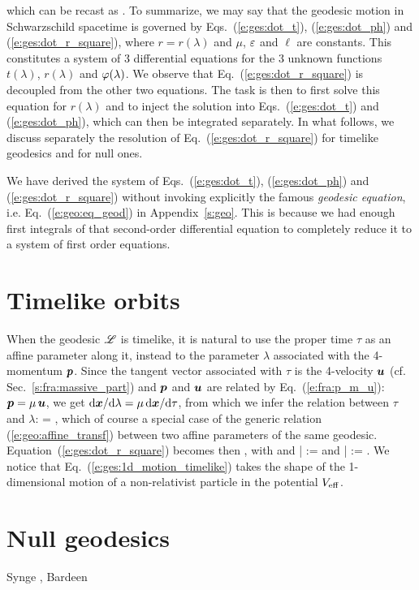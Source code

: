 which can be recast as
\be \label{e:ges:dot_r_square}
     .
\ee
To summarize, we may say that the geodesic motion in Schwarzschild spacetime is governed by
Eqs.~(\ref{e:ges:dot_t}), (\ref{e:ges:dot_ph}) and (\ref{e:ges:dot_r_square}),
where $r=r(\lambda)$ and $\mu$, $\varepsilon$ and $\ell$ are constants.
This constitutes a system of 3 differential equations for the 3 unknown
functions $t(\lambda)$, $r(\lambda)$ and $\varphi(\lambda)$.
We observe
that Eq.~(\ref{e:ges:dot_r_square}) is decoupled from the other two equations.
The task is then to first solve this equation for $r(\lambda)$ and to inject
the solution into Eqs.~(\ref{e:ges:dot_t}) and (\ref{e:ges:dot_ph}), which
can then be integrated separately.
In what follows, we discuss separately the resolution of
Eq.~(\ref{e:ges:dot_r_square}) for timelike geodesics and for null ones.

\begin{remark}
We have derived the system of Eqs.~(\ref{e:ges:dot_t}), (\ref{e:ges:dot_ph}) and (\ref{e:ges:dot_r_square}) without invoking explicitly the
famous \emph{geodesic equation}, i.e.
Eq.~(\ref{e:geo:eq_geod}) in Appendix~\ref{s:geo}.
This is because we had enough
first integrals of that second-order differential equation to completely reduce it to
a system of first order equations.
\end{remark}

\section{Timelike orbits}

When the geodesic $\mathscr{L}$ is timelike, it is natural to use the proper time $\tau$
as an affine parameter along it, instead to the parameter $\lambda$ associated
with the 4-momentum $\bm{p}$. Since the tangent vector associated with $\tau$
is the 4-velocity $\bm{u}$ (cf. Sec.~\ref{s:fra:massive_part}) and $\bm{p}$ and $\bm{u}$ are related by
Eq.~(\ref{e:fra:p_m_u}): $\bm{p} = \mu \, \bm{u}$, we get
$\mathrm{d}\bm{x}/\mathrm{d}\lambda = \mu \, \mathrm{d}\bm{x}/\mathrm{d}\tau$, from which we infer the relation
between $\tau$ and $\lambda$:
\be
    \tau = \mu \lambda ,
\ee
which of course a special case of the generic relation (\ref{e:geo:affine_transf})
between two affine parameters of the same geodesic.
Equation~(\ref{e:ges:dot_r_square}) becomes then
\be \label{e:ges:1d_motion_timelike}
     ,
\ee
with
\be
\ee
and
\be
   \bar{\veps} := \frac{\veps}{\mu} \qquad\mbox{and}\qquad
   \bar{\ell} :=  \frac{\ell}{\mu} .
\ee
We notice that Eq.~(\ref{e:ges:1d_motion_timelike}) takes the shape of
the 1-dimensional motion of a non-relativist particle in the potential
$V_{\rm eff}$.

\section{Null geodesics}


\begin{hist}
Synge \cite{Synge66}, Bardeen \cite{Barde73}
\end{hist}
